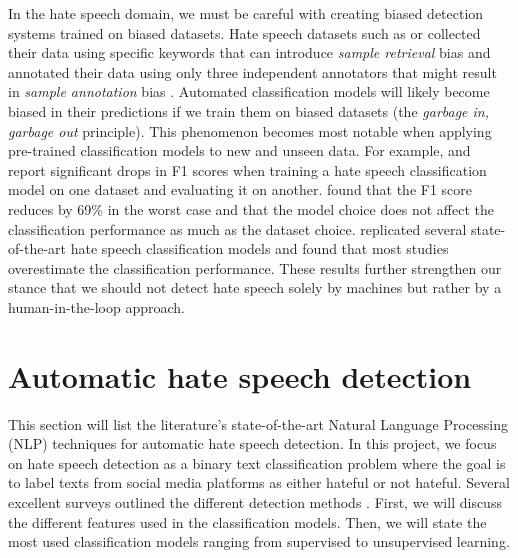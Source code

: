 %
In the hate speech domain, we must be careful with creating biased detection systems trained on biased datasets.
%
%
%
Hate speech datasets such as \citet{waseem2016hateful} or \citet{basile2019semeval} collected their data using specific keywords that can introduce \textit{sample retrieval} bias and annotated their data using only three independent annotators that might result in \textit{sample annotation} bias \citep{balayn2021automatic}.
%
Automated classification models will likely become biased in their predictions if we train them on biased datasets (the \emph{garbage in, garbage out} principle).
%
This phenomenon becomes most notable when applying pre-trained classification models to new and unseen data.
%
For example, \citet{grondahl2018all} and \citet{arango2019hate} report significant drops in F1 scores when training a hate speech classification model on one dataset and evaluating it on another.
%
\citet{grondahl2018all} found that the F1 score reduces by 69\% in the worst case and that the model choice does not affect the classification performance as much as the dataset choice.
%
\citet{arango2019hate} replicated several state-of-the-art hate speech classification models and found that most studies overestimate the classification performance.
%
These results further strengthen our stance that we should not detect hate speech solely by machines but rather by a human-in-the-loop approach.

\section{Automatic hate speech detection}
\label{sec:related-work-detection-algorithms}
%
This section will list the literature's state-of-the-art Natural Language Processing (NLP) techniques for automatic hate speech detection.
%
In this project, we focus on hate speech detection as a binary text classification problem where the goal is to label texts from social media platforms as either hateful or not hateful.
%
Several excellent surveys outlined the different detection methods \citep{fortuna2018survey, schmidt2019survey}.
%
First, we will discuss the different features used in the classification models.
%
Then, we will state the most used classification models ranging from supervised to unsupervised learning.
%

